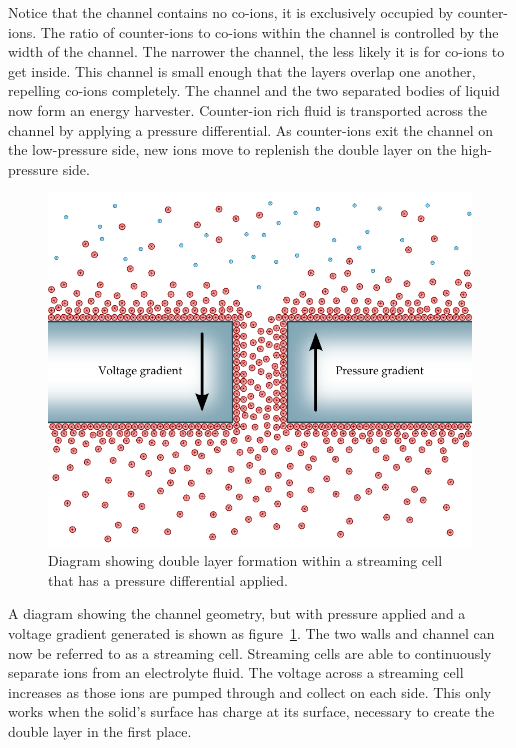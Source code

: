   Notice that the channel contains no co-ions, it is exclusively occupied by counter-ions.
  The ratio of counter-ions to co-ions within the channel is controlled by the width of the channel.
  The narrower the channel, the less likely it is for co-ions to get inside.
  This channel is small enough that the layers overlap one another, repelling co-ions completely.
  The channel and the two separated bodies of liquid now form an energy harvester.
  Counter-ion rich fluid is transported across the channel by applying a pressure differential.
  As counter-ions exit the channel on the low-pressure side, new ions move to replenish the double layer on the high-pressure side.
  \begin{figure}[t]
      \centering
      \includegraphics{content/pt1/01-PowerHarvesting/graphics/intro_2_channel}
      \caption{\label{fig:doubleLayerInChannel_withPressure}Diagram showing double layer formation within a streaming cell that has a pressure differential applied.}
  \end{figure}
  A diagram showing the channel geometry, but with pressure applied and a voltage gradient generated is shown as figure~\ref{fig:doubleLayerInChannel_withPressure}.
  The two walls and channel can now be referred to as a streaming cell.
  Streaming cells are able to continuously separate ions from an electrolyte fluid.
  The voltage across a streaming cell increases as those ions are pumped through and collect on each side.
  This only works when the solid's surface has charge at its surface, necessary to create the double layer in the first place.

